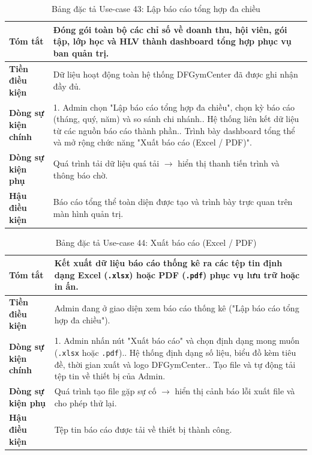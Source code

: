 \documentclass[a4paper,12pt]{article}
\begin{document}
\begin{table}[H]\centering\footnotesize
\begin{tabularx}{\textwidth}{|L{3.2cm}|Y|}
\hline \textbf{Tóm tắt} & Đóng gói toàn bộ các chỉ số về doanh thu, hội viên, gói tập, lớp học và HLV thành dashboard tổng hợp phục vụ ban quản trị. \\ \hline
\textbf{Tiền điều kiện} & Dữ liệu hoạt động toàn hệ thống DFGymCenter đã được ghi nhận đầy đủ. \\ \hline
\textbf{Dòng sự kiện chính} & 1. Admin chọn "Lập báo cáo tổng hợp đa chiều", chọn kỳ báo cáo (tháng, quý, năm) và so sánh chi nhánh.. Hệ thống liên kết dữ liệu từ các nguồn báo cáo thành phần.. Trình bày dashboard tổng thể và mở rộng chức năng "Xuất báo cáo (Excel / PDF)". \\ \hline
\textbf{Dòng sự kiện phụ} & Quá trình tải dữ liệu quá tải $\rightarrow$ hiển thị thanh tiến trình và thông báo chờ. \\ \hline
\textbf{Hậu điều kiện} & Báo cáo tổng thể toàn diện được tạo và trình bày trực quan trên màn hình quản trị. \\ \hline
\end{tabularx}
\caption{Bảng đặc tả Use-case 43: Lập báo cáo tổng hợp đa chiều}
\end{table}

\begin{table}[H]\centering\footnotesize
\begin{tabularx}{\textwidth}{|L{3.2cm}|Y|}
\hline \textbf{Tóm tắt} & Kết xuất dữ liệu báo cáo thống kê ra các tệp tin định dạng Excel (\texttt{.xlsx}) hoặc PDF (\texttt{.pdf}) phục vụ lưu trữ hoặc in ấn. \\ \hline
\textbf{Tiền điều kiện} & Admin đang ở giao diện xem báo cáo thống kê ("Lập báo cáo tổng hợp đa chiều"). \\ \hline
\textbf{Dòng sự kiện chính} & 1. Admin nhấn nút "Xuất báo cáo" và chọn định dạng mong muốn (\texttt{.xlsx} hoặc \texttt{.pdf}).. Hệ thống định dạng số liệu, biểu đồ kèm tiêu đề, thời gian xuất và logo DFGymCenter.. Tạo file và tự động tải tệp tin về thiết bị của Admin. \\ \hline
\textbf{Dòng sự kiện phụ} & Quá trình tạo file gặp sự cố $\rightarrow$ hiển thị cảnh báo lỗi xuất file và cho phép thử lại. \\ \hline
\textbf{Hậu điều kiện} & Tệp tin báo cáo được tải về thiết bị thành công. \\ \hline
\end{tabularx}
\caption{Bảng đặc tả Use-case 44: Xuất báo cáo (Excel / PDF)}
\end{table}
\end{document}
